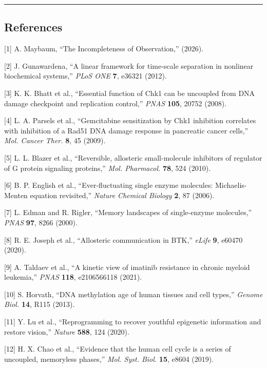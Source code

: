 \documentclass[
]{article}
\begin{document}
\begin{center}\rule{0.5\linewidth}{0.5pt}\end{center}

\hypertarget{references}{%
\subsection{References}\label{references}}

{[}1{]} A. Maybaum, ``The Incompleteness of Observation,'' (2026).

{[}2{]} J. Gunawardena, ``A linear framework for time-scale separation
in nonlinear biochemical systems,'' \emph{PLoS ONE} \textbf{7}, e36321
(2012).

{[}3{]} K. K. Bhatt et al., ``Essential function of Chk1 can be
uncoupled from DNA damage checkpoint and replication control,''
\emph{PNAS} \textbf{105}, 20752 (2008).

{[}4{]} L. A. Parsels et al., ``Gemcitabine sensitization by Chk1
inhibition correlates with inhibition of a Rad51 DNA damage response in
pancreatic cancer cells,'' \emph{Mol. Cancer Ther.} \textbf{8}, 45
(2009).

{[}5{]} L. L. Blazer et al., ``Reversible, allosteric small-molecule
inhibitors of regulator of G protein signaling proteins,'' \emph{Mol.
Pharmacol.} \textbf{78}, 524 (2010).

{[}6{]} B. P. English et al., ``Ever-fluctuating single enzyme
molecules: Michaelis-Menten equation revisited,'' \emph{Nature Chemical
Biology} \textbf{2}, 87 (2006).

{[}7{]} L. Edman and R. Rigler, ``Memory landscapes of single-enzyme
molecules,'' \emph{PNAS} \textbf{97}, 8266 (2000).

{[}8{]} R. E. Joseph et al., ``Allosteric communication in BTK,''
\emph{eLife} \textbf{9}, e60470 (2020).

{[}9{]} A. Taldaev et al., ``A kinetic view of imatinib resistance in
chronic myeloid leukemia,'' \emph{PNAS} \textbf{118}, e2106566118
(2021).

{[}10{]} S. Horvath, ``DNA methylation age of human tissues and cell
types,'' \emph{Genome Biol.} \textbf{14}, R115 (2013).

{[}11{]} Y. Lu et al., ``Reprogramming to recover youthful epigenetic
information and restore vision,'' \emph{Nature} \textbf{588}, 124
(2020).

{[}12{]} H. X. Chao et al., ``Evidence that the human cell cycle is a
series of uncoupled, memoryless phases,'' \emph{Mol. Syst. Biol.}
\textbf{15}, e8604 (2019).
\end{document}
